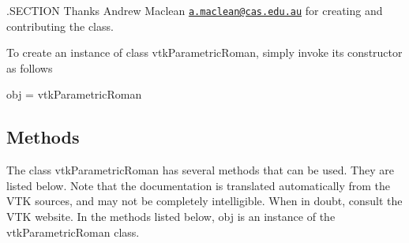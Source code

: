 .S\-E\-C\-T\-I\-O\-N Thanks Andrew Maclean \href{mailto:a.maclean@cas.edu.au}{\tt a.\-maclean@cas.\-edu.\-au} for creating and contributing the class.

To create an instance of class vtk\-Parametric\-Roman, simply invoke its constructor as follows \begin{DoxyVerb}  obj = vtkParametricRoman
\end{DoxyVerb}
 \hypertarget{vtkwidgets_vtkxyplotwidget_Methods}{}\subsection{Methods}\label{vtkwidgets_vtkxyplotwidget_Methods}
The class vtk\-Parametric\-Roman has several methods that can be used. They are listed below. Note that the documentation is translated automatically from the V\-T\-K sources, and may not be completely intelligible. When in doubt, consult the V\-T\-K website. In the methods listed below, {\ttfamily obj} is an instance of the vtk\-Parametric\-Roman class. 
